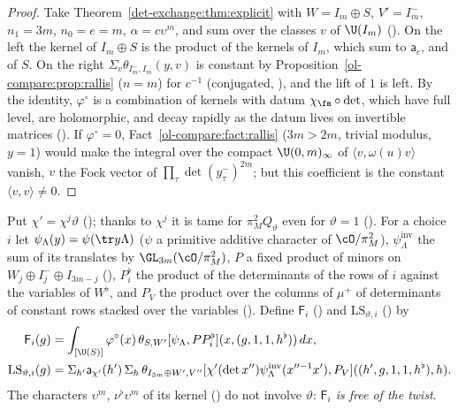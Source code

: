 \begin{proof}
Take Theorem~\ref{det-exchange:thm:explicit} with $W=I_m\oplus S$, $V'=I_m^-$, $n_1=3m$, $n_0=e=m$,
$\alpha=c\upsilon^m$, and sum over the classes $v$ of $\U(I_m)$
(). On the left the kernel of $I_m\oplus S$ is
the product of the kernels of $I_m$, which sum to $\mathsf a_c$, and of $S$. On the right
$\Sigma_v\theta_{I_m^-,I_m}(y,v)$ is constant by Proposition~\ref{ol-compare:prop:rallis} ($n=m$) for $c^{-1}$
(conjugated, ), and the lift of $1$ is left.
By the identity, $\varphi^\circ$ is a combination of kernels with datum $\chi_\fm\circ\det$, which have full
level, are holomorphic, and decay rapidly as the datum lives on invertible matrices
(). If $\varphi^\circ=0$, Fact~\ref{ol-compare:fact:rallis} ($3m>2m$, trivial modulus, $y=1$) would make the integral over the compact $\U(0,m)_\infty$ of $\langle v,\omega(u)v\rangle$ vanish, $v$ the
Fock vector of $\prod_\tau\det(y^-_\tau)^{2m}$; but this coefficient is the constant $\langle v,v\rangle\ne0$.
\end{proof}

Put $\chi'=\chi^j\vartheta$
(); thanks to $\chi^j$ it is tame for $\pi_M^2Q_\vartheta$ even for
$\vartheta=1$ (). For a choice $i$ let
$\psi_\Lambda(y)=\psi(\tr y\Lambda)$ ($\psi$ a primitive additive character of $\cO/\pi_M^2$),
$\psi^{\mathrm{inv}}_\Lambda$ the sum of its translates by
$\GL_{3m}(\cO/\pi_M^2)$, $P$ a fixed product of minors on $W_j\oplus I_j^-\oplus I_{3m-j}$
(), $P^\flat_i$ the product of the determinants of the rows of $i$
against the variables of $W^\flat$, and $P_V$ the product over the columns of $\mu^+$ of determinants of
constant rows stacked over the variables (). Define
$\mathsf F_i$ () and $\mathrm{LS}_{\vartheta,i}$ () by
\begin{align*}
  \mathsf F_i(g)&=\int_{[\U(S)]}\varphi^\circ(x)\,\theta_{S,W'}[\psi_\Lambda,PP^\flat_i](x,(g,1,1,h^\flat))\,dx,\\
  \mathrm{LS}_{\vartheta,i}(g)&=\Sigma_{h'}\mathsf a_{\chi'}(h')\,\Sigma_h\,
  \theta_{I_{3m}\oplus W',V''}[\chi'(\det x'')\psi^{\mathrm{inv}}_\Lambda(x''^{-1}x'),P_V]((h',g,1,1,h^\flat),h).
\end{align*}
The characters $\upsilon^m$, $\nu^\flat\upsilon^m$ of its kernel
() do not involve $\vartheta$: \emph{$\mathsf F_i$ is free of the twist}.

